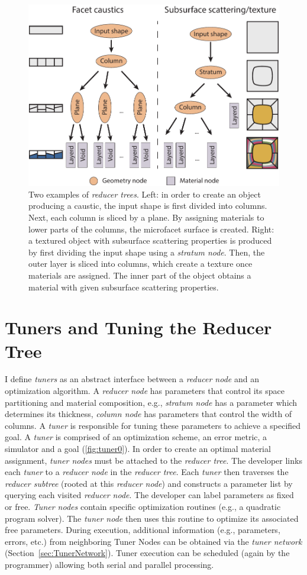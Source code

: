 \begin{figure}[h]
\centering
\includegraphics[width=0.7\linewidth]{figure/redNetworkNew.pdf}
\caption{Two examples of \emph{reducer trees}. Left: in order to create an object producing a caustic, the input shape is first divided into columns. Next, each column is sliced by a plane.
By assigning materials to lower parts of the columns, the microfacet surface is created.
Right: a textured object with subsurface scattering properties is produced by first dividing the input shape using a \emph{stratum node}. Then, the outer layer is sliced into columns, which create a texture once materials are assigned. The inner part of the object obtains a material with given subsurface scattering properties.  
}
\label{fig:red1}
\end{figure}

\section{Tuners and Tuning the Reducer Tree}
I define \emph{tuners} as an abstract interface between a \emph{reducer node} and an optimization algorithm. 
A \emph{reducer node} has parameters that control its space partitioning and material composition, e.g., \emph{stratum node} has a parameter which determines its thickness, \emph{column node} has parameters that control the width of columns.
A \emph{tuner} is responsible for tuning these parameters to achieve a specified goal.
A \emph{tuner} is comprised of an optimization scheme, an error metric, a simulator and a goal (\autoref{fig:tuner0}). 
In order to create an optimal material assignment, \emph{tuner nodes} must be attached to the \emph{reducer tree}. The developer links each \emph{tuner} to a \emph{reducer node} in the \emph{reducer tree}. Each \emph{tuner} then traverses the \emph{reducer subtree} (rooted at this \emph{reducer node}) and constructs a parameter list by querying each visited \emph{reducer node}. The developer can label parameters as fixed or free. \emph{Tuner nodes} contain specific optimization routines (e.g., a quadratic program solver). The \emph{tuner node} then uses this routine to optimize its associated free parameters. During execution, additional information (e.g., parameters, errors, etc.) from neighboring Tuner Nodes can be obtained via the \emph{tuner network} (Section~\ref{sec:TunerNetwork}).  Tuner execution can be scheduled (again by the programmer) allowing both serial and parallel processing. 

